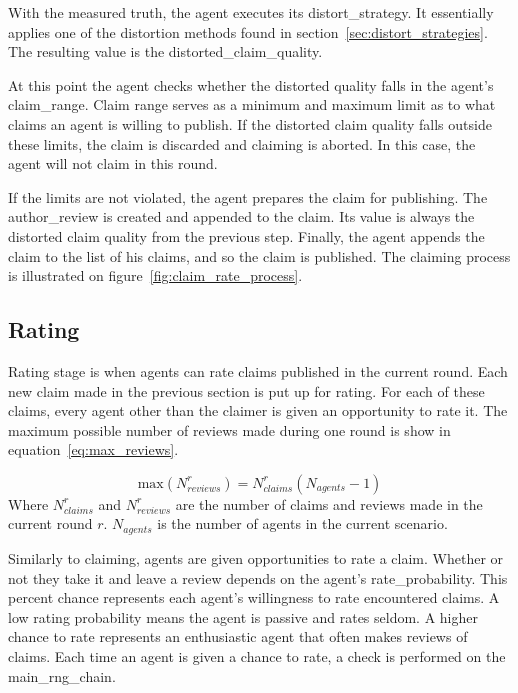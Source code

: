 \documentclass[%
    ]{\PathToTumTemplate/thesis/tum_thesis}
\begin{document}
With the measured truth, the agent executes its \gls{distort_strategy}.
It essentially applies one of the distortion methods found in section~\ref{sec:distort_strategies}.
The resulting value is the \gls{distorted_claim_quality}.

At this point the agent checks whether the distorted quality falls in the agent's \gls{claim_range}.
Claim range serves as a minimum and maximum limit as to what claims an agent is willing to publish.
If the distorted claim quality falls outside these limits, the claim is discarded and claiming is aborted.
In this case, the agent will not claim in this round.

If the limits are not violated, the agent prepares the claim for publishing.
The \gls{author_review} is created and appended to the claim.
Its value is always the distorted claim quality from the previous step.
Finally, the agent appends the claim to the list of his claims, and so the claim is published.
The claiming process is illustrated on figure~\ref{fig:claim_rate_process}.


\subsection{Rating}

Rating stage is when agents can rate claims published in the current round.
Each new claim made in the previous section is put up for rating.
For each of these claims, every agent other than the claimer is given an opportunity to rate it.
The maximum possible number of \glspl{review} made during one round is show in equation~\ref{eq:max_reviews}.

\begin{equation}\label{eq:max_reviews}
	\mathrm{max}(N^r_{reviews}) = N^r_{claims} (N_{agents}-1)
\end{equation}
Where $ N^r_{claims} $ and $ N^r_{reviews} $ are the number of claims and reviews made in the current round $r$.
$ N_{agents} $ is the number of agents in the current scenario.

Similarly to claiming, agents are given opportunities to rate a claim.
Whether or not they take it and leave a review depends on the agent's \gls{rate_probability}.
This percent chance represents each agent's willingness to rate encountered claims.
A low rating probability means the agent is passive and rates seldom.
A higher chance to rate represents an enthusiastic agent that often makes reviews of claims.
Each time an agent is given a chance to rate, a check is performed on the \gls{main_rng_chain}.
\end{document}
